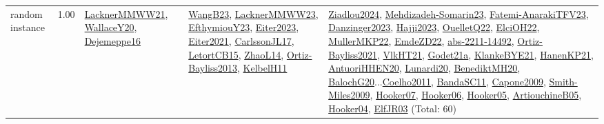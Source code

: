 {\begin{longtable}{p{3cm}r>{\raggedright\arraybackslash}p{6cm}>{\raggedright\arraybackslash}p{6cm}>{\raggedright\arraybackslash}p{8cm}}
\index{random instance}\index{Benchmarks!random instance}random instance &  1.00 & \hyperref[detail:LacknerMMWW21]{LacknerMMWW21}, \hyperref[detail:WallaceY20]{WallaceY20}, \hyperref[detail:Dejemeppe16]{Dejemeppe16} & \hyperref[detail:WangB23]{WangB23}, \hyperref[detail:LacknerMMWW23]{LacknerMMWW23}, \hyperref[detail:EfthymiouY23]{EfthymiouY23}, \hyperref[detail:Eiter2023]{Eiter2023}, \hyperref[detail:Eiter2021]{Eiter2021}, \hyperref[detail:CarlssonJL17]{CarlssonJL17}, \hyperref[detail:LetortCB15]{LetortCB15}, \hyperref[detail:ZhaoL14]{ZhaoL14}, \hyperref[detail:Ortiz-Bayliss2013]{Ortiz-Bayliss2013}, \hyperref[detail:KelbelH11]{KelbelH11} & \hyperref[detail:Ziadlou2024]{Ziadlou2024}, \hyperref[detail:Mehdizadeh-Somarin23]{Mehdizadeh-Somarin23}, \hyperref[detail:Fatemi-AnarakiTFV23]{Fatemi-AnarakiTFV23}, \hyperref[detail:Danzinger2023]{Danzinger2023}, \hyperref[detail:Hajji2023]{Hajji2023}, \hyperref[detail:OuelletQ22]{OuelletQ22}, \hyperref[detail:ElciOH22]{ElciOH22}, \hyperref[detail:MullerMKP22]{MullerMKP22}, \hyperref[detail:EmdeZD22]{EmdeZD22}, \hyperref[detail:abs-2211-14492]{abs-2211-14492}, \hyperref[detail:Ortiz-Bayliss2021]{Ortiz-Bayliss2021}, \hyperref[detail:VlkHT21]{VlkHT21}, \hyperref[detail:Godet21a]{Godet21a}, \hyperref[detail:KlankeBYE21]{KlankeBYE21}, \hyperref[detail:HanenKP21]{HanenKP21}, \hyperref[detail:AntuoriHHEN20]{AntuoriHHEN20}, \hyperref[detail:Lunardi20]{Lunardi20}, \hyperref[detail:BenediktMH20]{BenediktMH20}, \hyperref[detail:BalochG20]{BalochG20}...\hyperref[detail:Coelho2011]{Coelho2011}, \hyperref[detail:BandaSC11]{BandaSC11}, \hyperref[detail:Capone2009]{Capone2009}, \hyperref[detail:Smith-Miles2009]{Smith-Miles2009}, \hyperref[detail:Hooker07]{Hooker07}, \hyperref[detail:Hooker06]{Hooker06}, \hyperref[detail:Hooker05]{Hooker05}, \hyperref[detail:ArtiouchineB05]{ArtiouchineB05}, \hyperref[detail:Hooker04]{Hooker04}, \hyperref[detail:ElfJR03]{ElfJR03} (Total: 60)\\

\end{longtable}}
